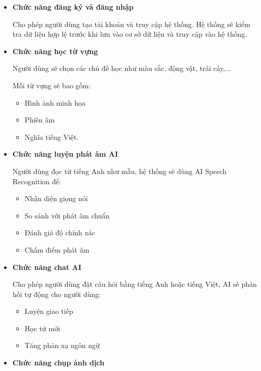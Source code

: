 \begin{itemize}[label=$\diamond$,leftmargin=1.2cm,itemsep=0.35cm]
	
	\item \textbf{Chức năng đăng ký và đăng nhập}
	
	Cho phép người dùng tạo tài khoản và truy cập hệ thống. Hệ thống sẽ kiểm tra dữ liệu hợp lệ trước khi lưu vào cơ sở dữ liệu và truy cập vào hệ thống.
	\item \textbf{Chức năng học từ vựng}
	
	Người dùng sẽ chọn các chủ đề học như màu sắc, động vật, trái cây,...
	
	Mỗi từ vựng sẽ bao gồm:
	
	\begin{itemize}[label=\textbullet,leftmargin=1.2cm,itemsep=0.15cm]
		\item Hình ảnh minh họa
		\item Phiên âm
		\item Nghĩa tiếng Việt.
	\end{itemize}
	
	\item \textbf{Chức năng luyện phát âm AI}
	
	Người dùng đọc từ tiếng Anh như mẫu, hệ thống sẽ dùng AI Speech Recognition để:
	
	\begin{itemize}[label=\textbullet,leftmargin=1.2cm,itemsep=0.15cm]
		\item Nhận diện giọng nói
		\item So sánh với phát âm chuẩn
		\item Đánh giá độ chính xác
		\item Chấm điểm phát âm
	\end{itemize}
	
	\item \textbf{Chức năng chat AI}
	
	Cho phép người dùng đặt câu hỏi bằng tiếng Anh hoặc tiếng Việt, AI sẽ phản hồi tự động cho người dùng:
	
	\begin{itemize}[label=\textbullet,leftmargin=1.2cm,itemsep=0.15cm]
		\item Luyện giao tiếp
		\item Học từ mới
		\item Tăng phản xạ ngôn ngữ
	\end{itemize}
	
	\item \textbf{Chức năng chụp ảnh dịch}
	

\end{itemize}
